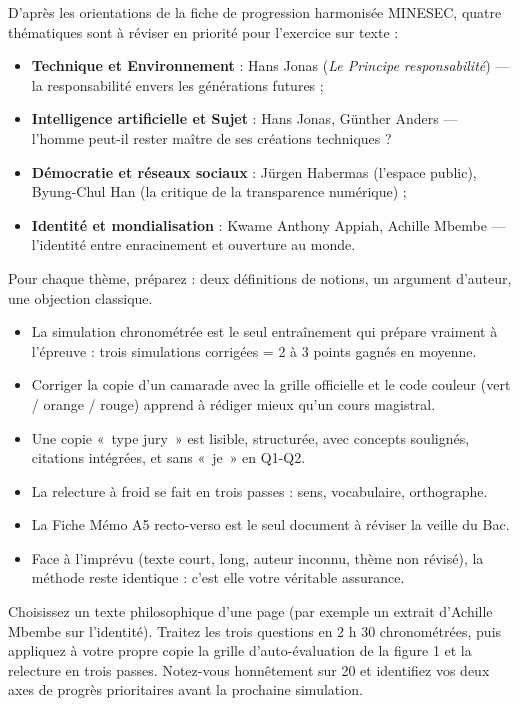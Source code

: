 \documentclass[11pt]{article}
\begin{document}
\begin{propriete}
D'après les orientations de la fiche de progression harmonisée MINESEC, quatre thématiques sont à réviser en priorité pour l'exercice sur texte :
\begin{itemize}
\item \textbf{Technique et Environnement} : Hans Jonas (\emph{Le Principe responsabilité}) — la responsabilité envers les générations futures ;
\item \textbf{Intelligence artificielle et Sujet} : Hans Jonas, Günther Anders — l'homme peut-il rester maître de ses créations techniques ?
\item \textbf{Démocratie et réseaux sociaux} : Jürgen Habermas (l'espace public), Byung-Chul Han (la critique de la transparence numérique) ;
\item \textbf{Identité et mondialisation} : Kwame Anthony Appiah, Achille Mbembe — l'identité entre enracinement et ouverture au monde.
\end{itemize}
Pour chaque thème, préparez : deux définitions de notions, un argument d'auteur, une objection classique.
\end{propriete}

\begin{aretenir}
\begin{itemize}
\item La simulation chronométrée est le seul entraînement qui prépare vraiment à l'épreuve : trois simulations corrigées = 2 à 3 points gagnés en moyenne.
\item Corriger la copie d'un camarade avec la grille officielle et le code couleur (vert / orange / rouge) apprend à rédiger mieux qu'un cours magistral.
\item Une copie «~type jury~» est lisible, structurée, avec concepts soulignés, citations intégrées, et sans «~je~» en Q1-Q2.
\item La relecture à froid se fait en trois passes : sens, vocabulaire, orthographe.
\item La Fiche Mémo A5 recto-verso est le seul document à réviser la veille du Bac.
\item Face à l'imprévu (texte court, long, auteur inconnu, thème non révisé), la méthode reste identique : c'est elle votre véritable assurance.
\end{itemize}
\end{aretenir}

\begin{exercice}
Choisissez un texte philosophique d'une page (par exemple un extrait d'Achille Mbembe sur l'identité). Traitez les trois questions en 2 h 30 chronométrées, puis appliquez à votre propre copie la grille d'auto-évaluation de la figure 1 et la relecture en trois passes. Notez-vous honnêtement sur 20 et identifiez vos deux axes de progrès prioritaires avant la prochaine simulation.
\end{exercice}
\end{document}
